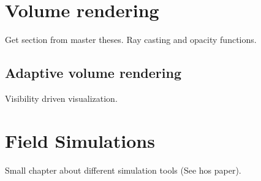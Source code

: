 \section{Volume rendering}

Get section from master theses. Ray casting and opacity functions.

\subsection{Adaptive volume rendering}

Visibility driven visualization.

\section{Field Simulations}

Small chapter about different simulation tools (See hos paper).
			
\endinput
